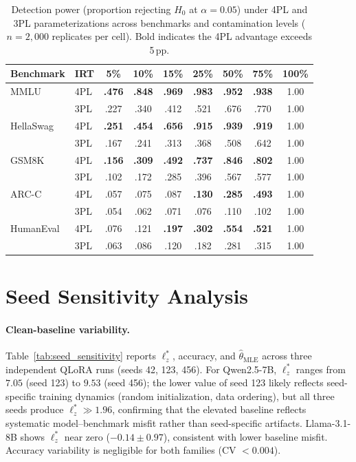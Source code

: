 \begin{table}[t]
\centering
\caption{Detection power (proportion rejecting $H_0$ at $\alpha{=}0.05$) under 4PL and 3PL parameterizations across benchmarks and contamination levels ($n{=}2{,}000$ replicates per cell). Bold indicates the 4PL advantage exceeds 5\,pp.}
\label{tab:4pl_3pl_power}
\small
\begin{tabular}{@{}llccccccc@{}}
\toprule
Benchmark & IRT & 5\% & 10\% & 15\% & 25\% & 50\% & 75\% & 100\% \\
\midrule
MMLU & 4PL & \textbf{.476} & \textbf{.848} & \textbf{.969} & \textbf{.983} & \textbf{.952} & \textbf{.938} & 1.00 \\
     & 3PL & .227 & .340 & .412 & .521 & .676 & .770 & 1.00 \\
\addlinespace
HellaSwag & 4PL & \textbf{.251} & \textbf{.454} & \textbf{.656} & \textbf{.915} & \textbf{.939} & \textbf{.919} & 1.00 \\
          & 3PL & .167 & .241 & .313 & .368 & .508 & .642 & 1.00 \\
\addlinespace
GSM8K & 4PL & \textbf{.156} & \textbf{.309} & \textbf{.492} & \textbf{.737} & \textbf{.846} & \textbf{.802} & 1.00 \\
      & 3PL & .102 & .172 & .285 & .396 & .567 & .577 & 1.00 \\
\addlinespace
ARC-C & 4PL & .057 & .075 & .087 & \textbf{.130} & \textbf{.285} & \textbf{.493} & 1.00 \\
      & 3PL & .054 & .062 & .071 & .076 & .110 & .102 & 1.00 \\
\addlinespace
HumanEval & 4PL & .076 & .121 & \textbf{.197} & \textbf{.302} & \textbf{.554} & \textbf{.521} & 1.00 \\
          & 3PL & .063 & .086 & .120 & .182 & .281 & .315 & 1.00 \\
\bottomrule
\end{tabular}
\end{table}

\section{Seed Sensitivity Analysis}
\label{app:seed_sensitivity}

\paragraph{Clean-baseline variability.}
Table~\ref{tab:seed_sensitivity} reports $\ell_z^*$, accuracy, and $\hat{\theta}_{\text{MLE}}$ across three independent QLoRA runs (seeds 42, 123, 456).
For Qwen2.5-7B, $\ell_z^*$ ranges from $7.05$ (seed 123) to $9.53$ (seed 456); the lower value of seed 123 likely reflects seed-specific training dynamics (random initialization, data ordering), but all three seeds produce $\ell_z^* \gg 1.96$, confirming that the elevated baseline reflects systematic model--benchmark misfit rather than seed-specific artifacts.
Llama-3.1-8B shows $\ell_z^*$ near zero ($-0.14 \pm 0.97$), consistent with lower baseline misfit.
Accuracy variability is negligible for both families (CV $< 0.004$).

